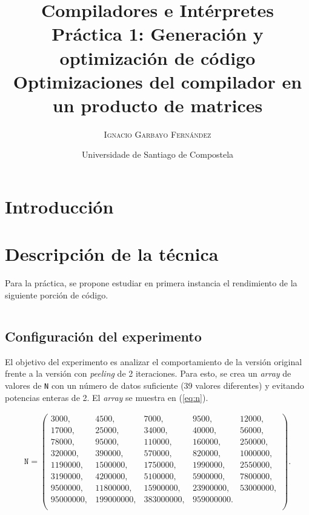\documentclass[11pt,a4paper,twoside]{article}
\title{%
	\LARGE \textbf{Compiladores e Intérpretes} \\ \vspace*{1cm} \textbf{Práctica 1: Generación y optimización de código}
	\\ \Large \textbf{Optimizaciones del compilador en un producto de matrices}}
\author{\textsc{Ignacio Garbayo Fernández}}
\date{Universidade de Santiago de Compostela}
\theoremstyle{definition}
\begin{document}
	
	\maketitle
	\thispagestyle{empty}
	
	\vspace*{1cm}
	
	\renewcommand{\contentsname}{Índice} %
	\tableofcontents


	\newpage


	\section{Introducción}
	
	
	

	\section{Descripción de la técnica}

	
	
	Para la práctica, se propone estudiar en primera instancia el rendimiento de la siguiente porción de código.
	
	\begin{verbatim}
	\end{verbatim}
	
	
	\subsection{Configuración del experimento}
	
	El objetivo del experimento es analizar el comportamiento de la versión original frente a la versión con \textit{peeling} de 2 iteraciones. Para esto, se crea un \textit{array} de valores de \texttt{N} con un número de datos suficiente (39 valores diferentes) y evitando potencias enteras de 2. El \textit{array} se muestra en (\ref{eq:n}).
	
	\begin{equation}\label{eq:n}
		\begin{aligned}
			\texttt{N} = \left(
			\begin{matrix}
				3000,      & 4500,      & 7000,      & 9500,      & 12000,		\\
				17000,     & 25000,     & 34000,     & 40000,     & 56000,		\\
				78000,     & 95000,     & 110000,    & 160000,    & 250000,		\\
				320000,    & 390000,    & 570000,    & 820000,    & 1000000,	\\
				1190000,   & 1500000,   & 1750000,   & 1990000,   & 2550000,	\\ 
				3190000,   & 4200000,   & 5100000,   & 5900000,   & 7800000,	\\
				9500000,   & 11800000,  & 15900000,  & 23900000,  & 53000000,	\\
				95000000,  & 199000000, & 383000000, & 959000000. &	\\
			\end{matrix}
			\right).
		\end{aligned}
	\end{equation}
\end{document}
